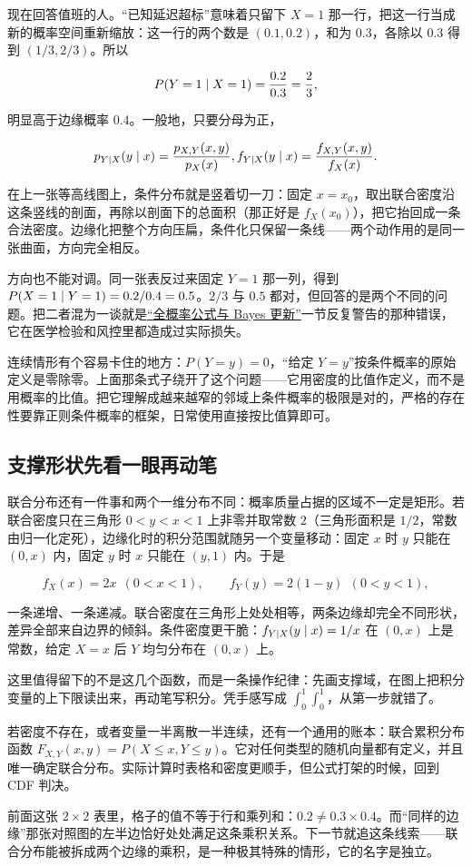 现在回答值班的人。``已知延迟超标''意味着只留下 \(X=1\) 那一行，把这一行当成新的概率空间重新缩放：这一行的两个数是 \((0.1,0.2)\)，和为 \(0.3\)，各除以 \(0.3\) 得到 \((1/3,2/3)\)。所以

\[
P(Y=1\mid X=1)=\frac{0.2}{0.3}=\frac23,
\]

明显高于边缘概率 \(0.4\)。一般地，只要分母为正，

\[
p_{Y\mid X}(y\mid x)=\frac{p_{X,Y}(x,y)}{p_X(x)},
\space
f_{Y\mid X}(y\mid x)=\frac{f_{X,Y}(x,y)}{f_X(x)}.
\]

在上一张等高线图上，条件分布就是竖着切一刀：固定 \(x=x_0\)，取出联合密度沿这条竖线的剖面，再除以剖面下的总面积（那正好是 \(f_X(x_0)\)），把它抬回成一条合法密度。边缘化把整个方向压扁，条件化只保留一条线——两个动作用的是同一张曲面，方向完全相反。

方向也不能对调。同一张表反过来固定 \(Y=1\) 那一列，得到 \(P(X=1\mid Y=1)=0.2/0.4=0.5\)。\(2/3\) 与 \(0.5\) 都对，但回答的是两个不同的问题。把二者混为一谈就是\hyperref[sec:05-Probability/02-Conditional-Probability/02]{``全概率公式与 Bayes 更新''}一节反复警告的那种错误，它在医学检验和风控里都造成过实际损失。

连续情形有个容易卡住的地方：\(P(Y=y)=0\)，``给定 \(Y=y\)''按条件概率的原始定义是零除零。上面那条式子绕开了这个问题——它用密度的比值作定义，而不是用概率的比值。把它理解成越来越窄的邻域上条件概率的极限是对的，严格的存在性要靠正则条件概率的框架，日常使用直接按比值算即可。

\subsection{支撑形状先看一眼再动笔}

联合分布还有一件事和两个一维分布不同：概率质量占据的区域不一定是矩形。若联合密度只在三角形 \(0<y<x<1\) 上非零并取常数 \(2\)（三角形面积是 \(1/2\)，常数由归一化定死），边缘化时的积分范围就随另一个变量移动：固定 \(x\) 时 \(y\) 只能在 \((0,x)\) 内，固定 \(y\) 时 \(x\) 只能在 \((y,1)\) 内。于是

\[
f_X(x)=2x\ \ (0<x<1),\qquad f_Y(y)=2(1-y)\ \ (0<y<1),
\]

一条递增、一条递减。联合密度在三角形上处处相等，两条边缘却完全不同形状，差异全部来自边界的倾斜。条件密度更干脆：\(f_{Y\mid X}(y\mid x)=1/x\) 在 \((0,x)\) 上是常数，给定 \(X=x\) 后 \(Y\) 均匀分布在 \((0,x)\) 上。

这里值得留下的不是这几个函数，而是一条操作纪律：先画支撑域，在图上把积分变量的上下限读出来，再动笔写积分。凭手感写成 \(\int_0^1\!\int_0^1\)，从第一步就错了。

\begin{remark}
若密度不存在，或者变量一半离散一半连续，还有一个通用的账本：联合累积分布函数 \(F_{X,Y}(x,y)=P(X\le x,Y\le y)\)。它对任何类型的随机向量都有定义，并且唯一确定联合分布。实际计算时表格和密度更顺手，但公式打架的时候，回到 CDF 判决。
\end{remark}

前面这张 \(2\times2\) 表里，格子的值不等于行和乘列和：\(0.2\ne 0.3\times 0.4\)。而``同样的边缘''那张对照图的左半边恰好处处满足这条乘积关系。下一节就追这条线索——联合分布能被拆成两个边缘的乘积，是一种极其特殊的情形，它的名字是独立。
